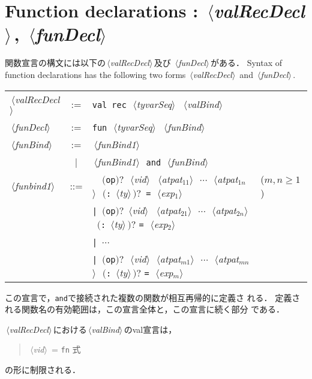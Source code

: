 \documentclass{jbook}
\newcommand{\txt}[2]{#2}
\newcommand{\vbar}{\mbox{\ $|$\ }}
\newcommand{\nonterm}[1]{\mbox{$\,\langle$}{\it #1}\mbox{$\rangle\,$}}
\newcommand{\term}[1]{\mbox{{\tt #1}}}
\newcommand{\optional}[1]{\mbox{$($}{\protect #1}\mbox{$)?$}}
\newenvironment{program}{\begin{quote}\begin{tt}}%
                        {\end{tt}\end{quote}}
\begin{document}
\fi%

\section{\txt{関数宣言}{Function declarations} : \nonterm{valRecDecl}, \nonterm{funDecl}}
\label{sec:reference:fundecl}

\ifjp%
	関数宣言の構文には以下の\nonterm{valRecDecl}及び
\nonterm{funDecl}がある．
\else%
	Syntax of function declarations has the following two forms
\nonterm{valRecDecl} and \nonterm{funDecl}.
\fi%

\begin{center}
\begin{tabular}{lcll}
\nonterm{valRecDecl}  &:= & \term{val}\ \term{rec}\ \nonterm{tyvarSeq}\ \nonterm{valBind} \\
\nonterm{funDecl}     &:= & \term{fun}\ \nonterm{tyvarSeq}\ \nonterm{funBind} \\
\nonterm{funBind}     &:=& \nonterm{funBind1} \\
                      &\vbar& \nonterm{funBind1}\ \term{and}\ \nonterm{funBind}\\
\nonterm{funbind1} &::=&
   \term{\ }\ \optional{\term{op}}\ \nonterm{vid}\ \nonterm{atpat$_{11}$}\ $\cdots$\ \nonterm{atpat$_{1n}$}\ \optional{\term{:} \nonterm{ty}}\
   \term{=}\ \nonterm{exp$_1$} & ($m,n\ge 1$)\\
&& \term{|}\ \optional{\term{op}} \nonterm{vid}\
   \nonterm{atpat$_{21}$}\ $\cdots$\ \nonterm{atpat$_{2n}$}\ \optional{\term{:} \nonterm{ty}} 
   \term{=}\ \nonterm{exp$_2$}\\
&&  \term{|}\ $\cdots$\\
&&  \term{|}\ \optional{\term{op}}\ \nonterm{vid} 
   \nonterm{atpat$_{m1}$}\ $\cdots$\ \nonterm{atpat$_{mn}$}\ \optional{\term{:} \nonterm{ty}} 
   \term{=}\ \nonterm{exp$_m$}
\end{tabular}
\end{center}

\ifjp%
	この宣言で，\term{and}で接続された複数の関数が相互再帰的に定義さ
れる．
	定義される関数名の有効範囲は，この宣言全体と，この宣言に続く部分
である．

	\nonterm{valRecDecl}における\nonterm{valBind}のval宣言は，
\begin{program}
\nonterm{vid} = \term{fn} 式
\end{program}
の形に制限される．
\end{document}

